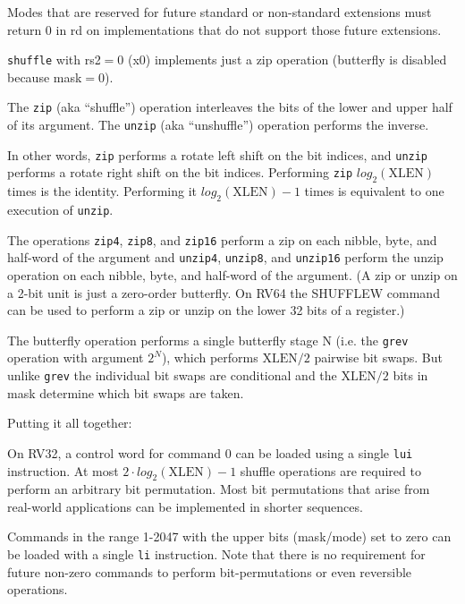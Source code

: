Modes that are reserved for future standard or non-standard extensions must return
0 in rd on implementations that do not support those future extensions.

\texttt{shuffle} with rs2$=$0 (x0) implements just a zip operation (butterfly is
disabled because mask$=$0).

The \texttt{zip} (aka ``shuffle'') operation interleaves the bits of the lower and upper
half of its argument. The \texttt{unzip} (aka ``unshuffle'') operation performs the inverse.

In other words, \texttt{zip} performs a rotate left shift on the bit indices,
and \texttt{unzip} performs a rotate right shift on the bit indices.
Performing \texttt{zip} $log_2(\textrm{XLEN})$ times is the identity. Performing it
$log_2(\textrm{XLEN})-1$ times is equivalent to one execution of \texttt{unzip}.



The operations \texttt{zip4}, \texttt{zip8}, and \texttt{zip16} perform a zip on each nibble,
byte, and half-word of the argument and \texttt{unzip4}, \texttt{unzip8}, and \texttt{unzip16}
perform the unzip operation on each nibble, byte, and half-word of the argument. (A zip or
unzip on a 2-bit unit is just a zero-order butterfly. On RV64 the SHUFFLEW command can be used
to perform a zip or unzip on the lower 32 bits of a register.)



The butterfly operation performs a single butterfly stage N (i.e. the {\tt grev} operation
with argument $2^N$), which performs $\textrm{XLEN}/2$ pairwise bit swaps. But unlike
{\tt grev} the individual bit swaps are conditional and the $\textrm{XLEN}/2$
bits in mask determine which bit swaps are taken.



Putting it all together:



On RV32, a control word for command 0 can be loaded using a single \texttt{lui} instruction.
At most $2\cdot{}log_2(\textrm{XLEN})-1$ shuffle operations are required to
perform an arbitrary bit permutation. Most bit permutations that arise from
real-world applications can be implemented in shorter sequences.

Commands in the range 1-2047 with the upper bits (mask/mode) set to zero can be
loaded with a single \texttt{li} instruction. Note that there is no
requirement for future non-zero commands to perform bit-permutations or even
reversible operations.

